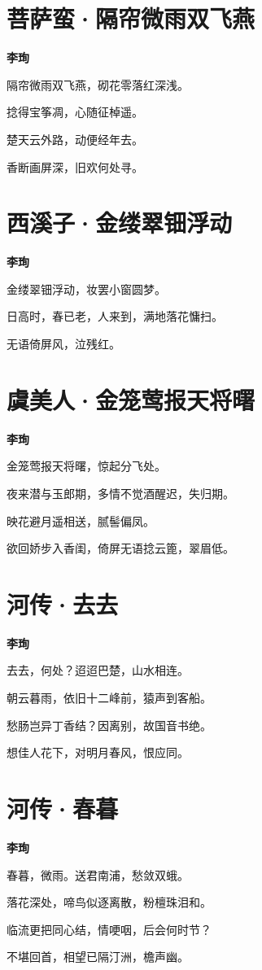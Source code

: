 \documentclass[12pt,a4paper]{ctexbook}
\begin{document}
\section{菩萨蛮·隔帘微雨双飞燕}
\textbf{李珣}\par\vspace{0.5em}
隔帘微雨双飞燕，砌花零落红深浅。\par
捻得宝筝凋，心随征棹遥。\par
楚天云外路，动便经年去。\par
香断画屏深，旧欢何处寻。\par

\section{西溪子·金缕翠钿浮动}
\textbf{李珣}\par\vspace{0.5em}
金缕翠钿浮动，妆罢小窗圆梦。\par
日高时，春已老，人来到，满地落花慵扫。\par
无语倚屏风，泣残红。\par

\section{虞美人·金笼莺报天将曙}
\textbf{李珣}\par\vspace{0.5em}
金笼莺报天将曙，惊起分飞处。\par
夜来潜与玉郎期，多情不觉酒醒迟，失归期。\par
映花避月遥相送，腻髻偏凤。\par
欲回娇步入香闺，倚屏无语捻云篦，翠眉低。\par

\section{河传·去去}
\textbf{李珣}\par\vspace{0.5em}
去去，何处？迢迢巴楚，山水相连。\par
朝云暮雨，依旧十二峰前，猿声到客船。\par
愁肠岂异丁香结？因离别，故国音书绝。\par
想佳人花下，对明月春风，恨应同。\par

\section{河传·春暮}
\textbf{李珣}\par\vspace{0.5em}
春暮，微雨。送君南浦，愁敛双蛾。\par
落花深处，啼鸟似逐离散，粉檀珠泪和。\par
临流更把同心结，情哽咽，后会何时节？\par
不堪回首，相望已隔汀洲，檐声幽。\par
\end{document}
